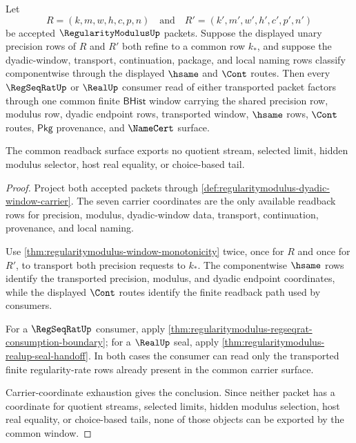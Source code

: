 \begin{theorem}
\label{thm:regularitymodulus-common-window-exactness}
Let
$$
R=(k,m,w,h,c,p,n)
\quad\text{and}\quad
R'=(k',m',w',h',c',p',n')
$$
be accepted $\RegularityModulusUp$ packets. Suppose the displayed unary
precision rows of $R$ and $R'$ both refine to a common row $k_*$, and suppose
the dyadic-window, transport, continuation, package, and local naming rows
classify componentwise through the displayed $\hsame$ and $\Cont$ routes.
Then every $\RegSeqRatUp$ or $\RealUp$ consumer read of either transported
packet factors through one common finite $\mathsf{BHist}$ window carrying the
shared precision row, modulus row, dyadic endpoint rows, transported window,
$\hsame$ rows, $\Cont$ routes, $\mathsf{Pkg}$ provenance, and $\NameCert$
surface.

The common readback surface exports no quotient stream, selected limit, hidden
modulus selector, host real equality, or choice-based tail.
\end{theorem}
\begin{proof}
Project both accepted packets through
\autoref{def:regularitymodulus-dyadic-window-carrier}. The seven carrier
coordinates are the only available readback rows for precision, modulus,
dyadic-window data, transport, continuation, provenance, and local naming.

Use \autoref{thm:regularitymodulus-window-monotonicity} twice, once for $R$
and once for $R'$, to transport both precision requests to $k_*$. The
componentwise $\hsame$ rows identify the transported precision, modulus, and
dyadic endpoint coordinates, while the displayed $\Cont$ routes identify the
finite readback path used by consumers.

For a $\RegSeqRatUp$ consumer, apply
\autoref{thm:regularitymodulus-regseqrat-consumption-boundary}; for a
$\RealUp$ seal, apply
\autoref{thm:regularitymodulus-realup-seal-handoff}. In both cases the
consumer can read only the transported finite regularity-rate rows already
present in the common carrier surface.

Carrier-coordinate exhaustion gives the conclusion. Since neither packet has
a coordinate for quotient streams, selected limits, hidden modulus selection,
host real equality, or choice-based tails, none of those objects can be
exported by the common window.
\end{proof}

